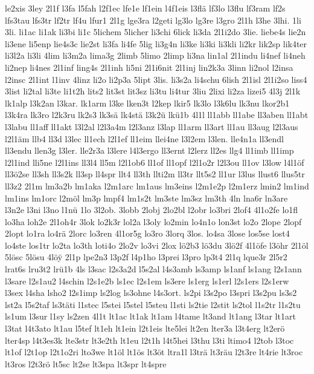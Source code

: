 {le2xis
3ley
2l1f
l3fa
l5fah
l2f1ec
lfe1e
lf1ein
l4f1eis
l3flä
lf3lo
l3flu
lf3ram
lf2s
lfs3tau
lfs3tr
lf2tr
lf4u
lfur1
2l1g
lge3ra
l2geti
lg3lo
lg3re
l3gro
2l1h
l3he
3lhi.
1li
3li.
li1ac
li1ak
li3bi
li1c
5lichem
5licher
li3chi
6lick
li3da
2l1i2do
3lie.
liebe4s
lie2n
li3ene
li5enp
lie4s3c
lie2st
li3fa
li4fe
5lig
li3g4n
li3ke
li3ki
li3kli
li2kr
lik2sp
lik4ter
li3l2a
li3li
4lim
li3m2a
lima3g
2limb
5limo
2limp
li3na
lin1al
2l1indu
li4nef
li4neh
li2nep
li4nes
2l1inf
ling4s
2l1inh
li5ni
2l1i6nit
2l1inj
lin2k3a
3linn
li2nol
l2insa
l2insc
2l1int
l1inv
4linz
li2o
li2p3a
5lipt
3lis.
li3s2a
li4schu
6lish
2l1isl
2l1i2so
liss4
3list
li2tal
li3te
li1t2h
lits2
lit3st
lit3sz
li3tu
li4tur
3liu
2lixi
li2za
lizei5
4l3j
2l1k
lk1alp
l3k2an
l3kar.
lk1arm
l3ke
lken3t
l2kep
lkir5
lk3lo
l3k6lu
lk3nu
lkor2b1
l3k4ra
lk3ro
l2k3ru
lk2s3
lk3sä
lk4stä
l3k2ü
lkü1b
4l1l
ll1abb
ll1abe
ll3aben
ll1abt
l3labu
ll1aff
ll1akt
l3l2al
l2l3a4m
l2l3anz
l3lap
ll1arm
ll3art
ll1au
ll3aug
l2l3aus
l2l1äm
llb4
ll3d
l3lec
ll1ech
l2l1ef
ll1eim
llei4ne
l3l2em
l3len.
lle4n1a
ll3endl
ll3endu
llen3g
l3ler.
lle2r3a
l3lere
l4l3ergo
ll3ernt
l2lerz
ll2es
llg4
ll1imb
ll1imp
l2l1ind
lli5ne
l2l1ins
ll3l4
ll5m
l2l1ob6
ll1of
ll1opf
l2l1o2r
l2l3ou
ll1ov
l3low
l4l1öf
ll3ö2se
ll3sh
ll3s2k
ll3sp
ll4spr
llt4
ll3th
llti2m
ll3tr
llt5s2
ll1ur
l3lus
llust6
llus5tr
ll3z2
2l1m
lm3a2b
lm1aka
l2m1arc
lm1aus
lm3eins
l2m1e2p
l2m1erz
lmin2
lm1ind
lm1ins
lm1orc
l2möl
lm3p
lmpf4
lm1s2t
lm3ste
lm3sz
lm3th
4ln
lna6r
ln3are
l3n2e
l3ni
l3no
l1nü
1lo
3l2ob.
3lobb
2lobj
2lo2bl
l2obr
lo3bri
2lof4
4l1o2fe
lo1fl
lo3ha
loh2e
2l1oh4r
3lok
lo2k3r
lol2a
l3oly
lo2min
lo4n1o
lon3st
lo2o
2lope
2lopf
2lopt
lo1ra
lo4rä
2lorc
lo3ren
4l1or5g
lo3ro
3lorq
3los.
lo4sa
3lose
los5se
lost4
lo4ste
los1tr
lo2ta
lo3th
loti4o
2lo2v
lo3vi
2lox
lö2b3
lö3du
3lö2f
4l1öfe
l3öhr
2l1öl
5lösc
5lösu
4lö^^ff
2l1p
lpe2n3
l3p2f
l4p1ho
l3prei
l3pro
lp3t4
2l1q
lque3r
2l5r2
lrat6s
lru3t2
lrü1b
4ls
l3sac
l2s3a2d
l5s2al
l4s3amb
ls3amp
ls1anf
ls1ang
l2s1ann
l3sare
l2s1au2
l4schin
l2s1e2b
ls1ec
l2s1em
ls3ere
ls1erg
ls1erl
l2s1ers
l2s1erw
l3sex
l4sha
lsho2
l2s1imp
ls2log
ls3ohne
l4s3ort.
ls2pi
l3s2po
l3spri
l3s2pu
ls3s2
lst2a
l5s2taf
ls3täti
l1stec
l5stei
l5stel
l5steu
l1sti
ls2tie
l2stit
ls2tol
l1s2tr
l1s2tu
ls1um
l3sur
l1sy
ls2zen
4l1t
lt1ac
lt1ak
lt1am
l4tame
lt3and
lt1ang
l3tar
lt1art
l3tat
l4t3ato
lt1au
l5tef
lt1eh
lt1ein
l2t1eis
lte5lei
lt2en
lter3a
l3t4erg
lt2erö
lter4sp
l4t3es3k
lte3str
lt3e2th
lt1eu
l2t1h
l4t5hei
l3thu
l3ti
ltimo4
l2tob
l3toc
lt1of
l2t1op
l2t1o2ri
lto3we
lt1öl
lt1ös
lt3öt
ltra1l
l3trä
lt3räu
l2t3re
lt4rie
lt3roc
lt3ros
l2t3rö
lt5sc
lt2se
lt3spa
lt3spr
lt4spre
}

